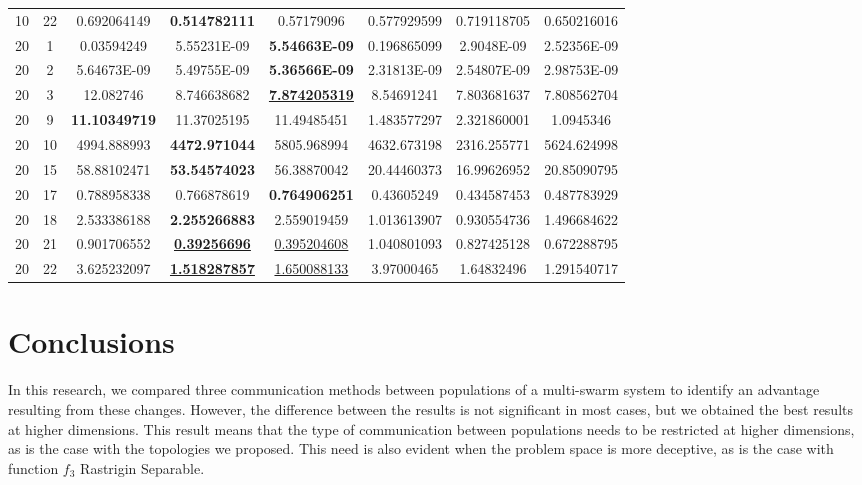 \documentclass[runningheads]{llncs}
\begin{document}
\begin{table}[h!tb]
{\begin{tabular}{|c|c||c|c|c||c|c|c|}
10	&	22	&	0.692064149	&	\textbf{0.514782111}	&	0.57179096	&	0.577929599	&	0.719118705	&	0.650216016	\\
20	&	1	&	0.03594249	&	5.55231E-09	&	\textbf{5.54663E-09}	&	0.196865099	&	2.9048E-09	&	2.52356E-09	\\
20	&	2	&	5.64673E-09	&	5.49755E-09	&	\textbf{5.36566E-09}	&	2.31813E-09	&	2.54807E-09	&	2.98753E-09	\\
20	&	3	&	12.082746	&	8.746638682	&	\underline{\textbf{7.874205319}}	&	8.54691241	&	7.803681637	&	7.808562704	\\
20	&	9	&	\textbf{11.10349719}	&	11.37025195	&	11.49485451	&	1.483577297	&	2.321860001	&	1.0945346	\\
20	&	10	&	4994.888993	&	\textbf{4472.971044}	&	5805.968994	&	4632.673198	&	2316.255771	&	5624.624998	\\
20	&	15	&	58.88102471	&	\textbf{53.54574023}	&	56.38870042	&	20.44460373	&	16.99626952	&	20.85090795	\\
20	&	17	&	0.788958338	&	0.766878619	&	\textbf{0.764906251}	&	0.43605249	&	0.434587453	&	0.487783929	\\
20	&	18	&	2.533386188	&	\textbf{2.255266883}	&	2.559019459	&	1.013613907	&	0.930554736	&	1.496684622	\\
20	&	21	&	0.901706552	&	\underline{\textbf{0.39256696}}	&	\underline{0.395204608}	&	1.040801093	&	0.827425128	&	0.672288795	\\
20	&	22	&	3.625232097	&	\underline{\textbf{1.518287857}}	&	\underline{1.650088133}	&	3.97000465	&	1.64832496	&	1.291540717	\\

    \hline
    \end{tabular}}
    \label{tab:my_label}
\end{table}
\hfill\break





\section{Conclusions}



In this research, we compared three communication methods between populations of
a multi-swarm system to identify an advantage resulting from these changes.
However, the difference between the results is not significant in most cases,
but we obtained the best results at higher dimensions. This result means that
the type of communication between populations needs to be restricted at higher
dimensions, as is the case with the topologies we proposed. This need is also
evident when the problem space is more deceptive, as is the case with function
$f_{3}$ Rastrigin Separable. 
\end{document}
